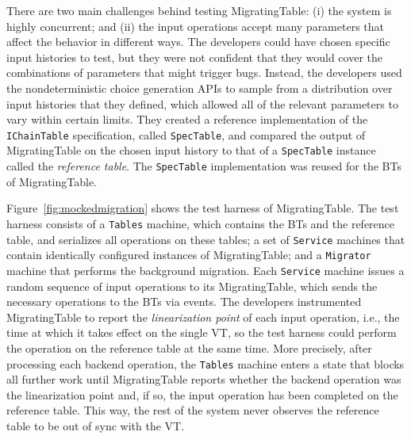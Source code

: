 There are two main challenges behind testing MigratingTable: (i) the system is highly concurrent; and (ii) the input operations accept many parameters that affect the behavior in different ways. The developers could have chosen specific input histories to test, but they were not confident that they would cover the combinations of parameters that might trigger bugs. Instead, the developers used the \psharp nondeterministic choice generation APIs to sample from a distribution over input histories that they defined, which allowed all of the relevant parameters to vary within certain limits. They created a reference implementation of the \texttt{IChainTable} specification, called \texttt{SpecTable}, and compared the output of MigratingTable on the chosen input history to that of a \texttt{SpecTable} instance called the \emph{reference table}. The \texttt{SpecTable} implementation was reused for the BTs of MigratingTable.

Figure~\ref{fig:mockedmigration} shows the \psharp test harness of MigratingTable. The test harness consists of a \texttt{Tables} machine, which contains the BTs and the reference table, and serializes all operations on these tables; a set of \texttt{Service} machines that contain identically configured instances of MigratingTable; and a \texttt{Migrator} machine that performs the background migration. Each \texttt{Service} machine issues a random sequence of input operations to its MigratingTable, which sends the necessary operations to the BTs via \psharp events. The developers instrumented MigratingTable to report the \emph{linearization point} of each input operation, i.e., the time at which it takes effect on the single VT, so the test harness could perform the operation on the reference table at the same time. More precisely, after processing each backend operation, the \texttt{Tables} machine enters a \psharp state that blocks all further work until MigratingTable reports whether the backend operation was the linearization point and, if so, the input operation has been completed on the reference table. This way, the rest of the system never observes the reference table to be out of sync with the VT.

